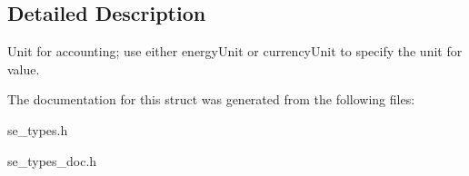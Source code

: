 \subsection{Detailed Description}
Unit for accounting; use either \textquotesingle{}energy\+Unit\textquotesingle{} or \textquotesingle{}currency\+Unit\textquotesingle{} to specify the unit for \textquotesingle{}value\textquotesingle{}. 

The documentation for this struct was generated from the following files\+:\begin{DoxyCompactItemize}
\item 
se\+\_\+types.\+h\item 
se\+\_\+types\+\_\+doc.\+h\end{DoxyCompactItemize}

